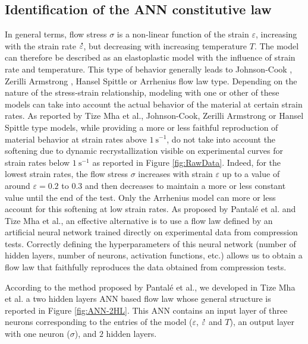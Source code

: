 \documentclass[metals,article,submit,pdftex,moreauthors]{Definitions/mdpi}
\makeatletter
\DeclareRobustCommand{\mdot}[1]{\accentset{\mbox{\bfseries .}}{#1}}
\DeclareRobustCommand{\eal}{et al.\@\xspace}
\DeclareRobustCommand{\ps}{\text{s}^{-1}}
\makeatother
\begin{document}
\subsection{Identification of the ANN constitutive law\label{subsec:ANNConstitutiveLaw}}
In general terms, flow stress $\sigma$ is a non-linear function of the strain $\varepsilon$, increasing with the strain rate $\mdot\varepsilon$, but decreasing with increasing temperature $T$.
The model can therefore be described as an elastoplastic model with the influence of strain rate and temperature.
This type of behavior generally leads to Johnson-Cook \cite{Johnson-1983}, Zerilli Armstrong \cite{Zerilli-1987}, Hansel Spittle \cite{Hensel-1978} or Arrhenius \cite{Sellars-1966} flow law type.
Depending on the nature of the stress-strain relationship, modeling with one or other of these models can take into account the actual behavior of the material at certain strain rates.
As reported by Tize Mha \eal \cite{TizeMha-2023}, Johnson-Cook, Zerilli Armstrong or Hansel Spittle type models, while providing a more or less faithful reproduction of material behavior at strain rates above $1~\ps$, do not take into account the softening due to dynamic recrystallization visible on experimental curves for strain rates below $1~\ps$ as reported in Figure  \ref{fig:RawData}.
Indeed, for the lowest strain rates, the flow stress $\sigma$ increases with strain $\varepsilon$ up to a value of around $\varepsilon=0.2$ to $0.3$ and then decreases to maintain a more or less constant value until the end of the test.
Only the Arrhenius model can more or less account for this softening at low strain rates.
As proposed by Pantalé \eal \cite{Pantale-2021, Pantale-2023} and Tize Mha \eal \cite{TizeMha-2023}, an effective alternative is to use a flow law defined by an artificial neural network trained directly on experimental data from compression tests.
Correctly defining the hyperparameters of this neural network (number of hidden layers, number of neurons, activation functions, etc.) allows us to obtain a flow law that faithfully reproduces the data obtained from compression tests.

According to the method proposed by Pantalé \eal \cite{Pantale-2021, Pantale-2023}, we developed in Tize Mha \eal \cite{TizeMha-2023} a two hidden layers ANN based flow law whose general structure is reported in Figure \ref{fig:ANN-2HL}.
This ANN contains an input layer of three neurons corresponding to the entries of the model ($\varepsilon$, $\mdot\varepsilon$ and $T$), an output layer with one neuron ($\sigma$), and $2$ hidden layers.
\end{document}
